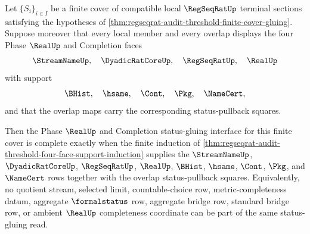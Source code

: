 \begin{theorem}
\label{thm:regseqrat-finite-cover-status-gluing-completeness}
Let $\{S_i\}_{i \in I}$ be a finite cover of compatible local $\RegSeqRatUp$ terminal sections satisfying the hypotheses of \autoref{thm:regseqrat-audit-threshold-finite-cover-gluing}. Suppose moreover that every local member and every overlap displays the four Phase $\RealUp$ and Completion faces
$$
\StreamNameUp,\quad \DyadicRatCoreUp,\quad \RegSeqRatUp,\quad \RealUp
$$
with support
$$
\BHist,\quad \hsame,\quad \Cont,\quad \Pkg,\quad \NameCert,
$$
and that the overlap maps carry the corresponding status-pullback squares.

Then the Phase $\RealUp$ and Completion status-gluing interface for this finite cover is complete exactly when the finite induction of \autoref{thm:regseqrat-audit-threshold-four-face-support-induction} supplies the $\StreamNameUp$, $\DyadicRatCoreUp$, $\RegSeqRatUp$, $\RealUp$, $\BHist$, $\hsame$, $\Cont$, $\Pkg$, and $\NameCert$ rows together with the overlap status-pullback squares. Equivalently, no quotient stream, selected limit, countable-choice row, metric-completeness datum, aggregate $\formalstatus$ row, aggregate bridge row, standard bridge row, or ambient $\RealUp$ completeness coordinate can be part of the same status-gluing read.
\end{theorem}
